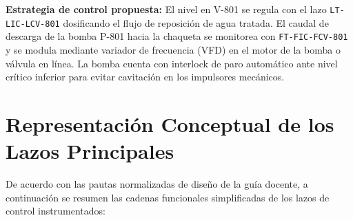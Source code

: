 \documentclass[10pt,letterpaper]{article}
\begin{document}
\textbf{Estrategia de control propuesta:} El nivel en V-801 se regula con el lazo \texttt{LT-LIC-LCV-801} dosificando el flujo de reposición de agua tratada. El caudal de descarga de la bomba P-801 hacia la chaqueta se monitorea con \texttt{FT-FIC-FCV-801} y se modula mediante variador de frecuencia (VFD) en el motor de la bomba o válvula en línea. La bomba cuenta con interlock de paro automático ante nivel crítico inferior para evitar cavitación en los impulsores mecánicos.

\newpage
\section{Representación Conceptual de los Lazos Principales}
De acuerdo con las pautas normalizadas de diseño de la guía docente, a continuación se resumen las cadenas funcionales simplificadas de los lazos de control instrumentados:
\end{document}
